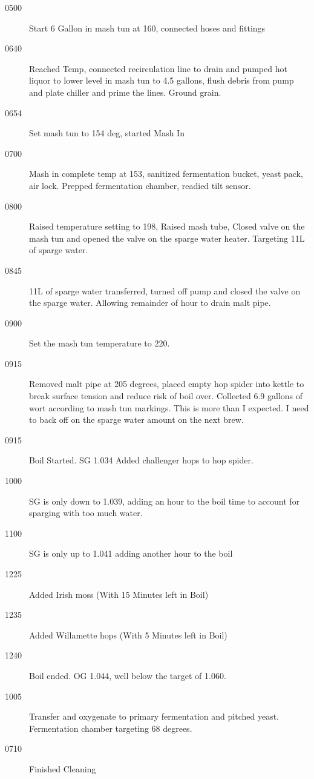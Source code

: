 \begin{description}
    \item[0500] Start 6 Gallon in mash tun at 160, connected hoses and fittings
    \item[0640] Reached Temp, connected recirculation line to drain and pumped hot liquor to lower level in mash tun to 4.5 gallons, flush debris from pump and plate chiller and prime the lines.  Ground grain.
    \item[0654] Set mash tun to 154 deg, started Mash In
    \item[0700] Mash in complete temp at 153, sanitized fermentation bucket, yeast pack, air lock.  Prepped fermentation chamber, readied tilt sensor.
    \item[0800] Raised temperature setting to 198, Raised mash tube, Closed valve on the mash tun and opened the valve on the sparge water heater.  Targeting 11L of sparge water.
    \item[0845] 11L of sparge water transferred, turned off pump and closed the valve on the sparge water.  Allowing remainder of hour to drain malt pipe.
    \item[0900] Set the mash tun temperature to 220.
    \item[0915] Removed malt pipe at 205 degrees, placed empty hop spider into kettle to break surface tension and reduce risk of boil over.  Collected 6.9 gallons of wort according to mash tun markings.  This is more than I expected.  I need to back off on the sparge water amount on the next brew.
    \item[0915] Boil Started. SG 1.034 Added challenger hops to hop spider.
    \item[1000] SG is only down to 1.039, adding an hour to the boil time to account for sparging with too much water.
    \item[1100] SG is only up to 1.041 adding another hour to the boil
    \item[1225] Added Irish moss (With 15 Minutes left in Boil)
    \item[1235] Added Willamette hops (With 5 Minutes left in Boil)
    \item[1240] Boil ended. OG 1.044, well below the target of 1.060.
    \item[1005] Transfer and oxygenate to primary fermentation and pitched yeast.  Fermentation chamber targeting 68 degrees.
    \item[0710] Finished Cleaning

\end{description}
